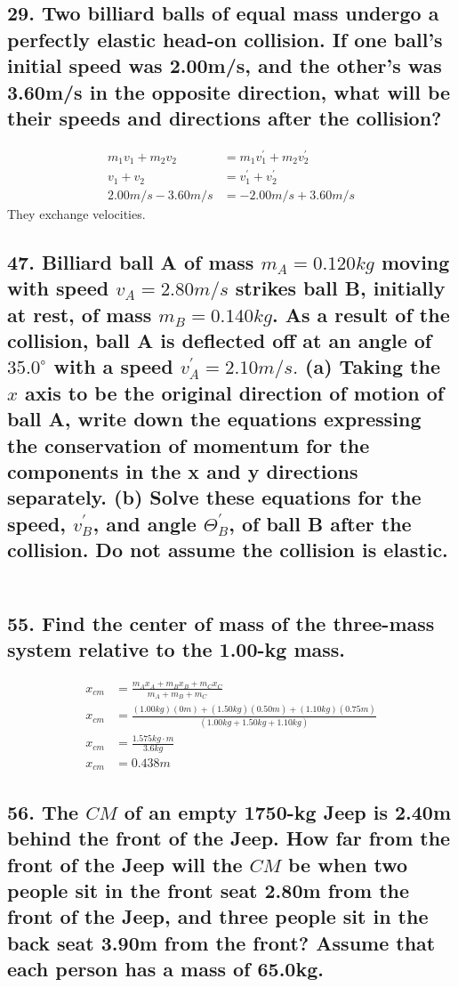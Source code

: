 \documentclass[12pt,a4paper,english]{article}
\begin{document}
\begin{flushleft}
  \subsection{29. Two billiard balls of equal mass undergo a perfectly elastic head-on collision. If one ball's initial speed was 2.00m/s, and the other's was 3.60m/s in the opposite direction, what will be their speeds and directions after the collision?}
  \begin{align*}
    m_1v_1+m_2v_2&=m_1v_1^\prime+m_2v_2^\prime
    \\
    v_1+v_2&=v_1^\prime+v_2^\prime
    \\
    2.00m/s-3.60m/s&=-2.00m/s+3.60m/s
  \end{align*}
  They exchange velocities.
  \subsection{47. Billiard ball A of mass $m_A=0.120kg$ moving with speed $v_A=2.80m/s$ strikes ball B, initially at rest, of mass $m_B=0.140kg$. As a result of the collision, ball A is deflected off at an angle of $35.0^\circ$ with a speed $v^\prime_A=2.10m/s.$ (a) Taking the $x$ axis to be the original direction of motion of ball A, write down the equations expressing the conservation of momentum for the components in the x and y directions separately. (b) Solve these equations for the speed, $v^\prime_B$, and angle $\Theta^\prime_B$, of ball B after the collision. Do not assume the collision is elastic.}
  \begin{align*}
  \end{align*}
  \subsection{55. Find the center of mass of the three-mass system relative to the 1.00-kg mass.}
  \begin{align*}
    x_{cm}&=\frac{m_Ax_A+m_Bx_B+m_Cx_C}{m_A+m_B+m_C}
    \\
    x_{cm}&=\frac{(1.00kg)(0m)+(1.50kg)(0.50m)+(1.10kg)(0.75m)}{(1.00kg+1.50kg+1.10kg)}
    \\
    x_{cm}&=\frac{1.575kg\cdot m}{3.6kg}
    \\
    x_{cm}&=0.438m
  \end{align*}
  \subsection{56. The $CM$ of an empty 1750-kg Jeep is 2.40m behind the front of the Jeep. How far from the front of the Jeep will the $CM$ be when two people sit in the front seat 2.80m from the front of the Jeep, and three people sit in the back seat 3.90m from the front? Assume that each person has a mass of 65.0kg.}
  \begin{align*}
  \end{align*}

\end{flushleft}
\end{document}
